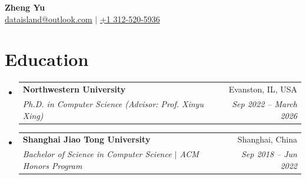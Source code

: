 \documentclass[letterpaper,11pt]{article}
\makeatletter
\newcommand{\resumeSubheadingDense}[4]{
  \vspace{-2pt}\item
    \begin{tabular*}{0.97\textwidth}[t]{l@{\extracolsep{\fill}}r}
      \textbf{#1} & #2 \\
      \textit{\small#3} & \textit{\small #4} \\
    \end{tabular*}\vspace{-12pt}
}
\newcommand{\resumeSubHeadingListStart}{\begin{itemize}[leftmargin=0.15in, label={}]}
\newcommand{\resumeSubHeadingListEnd}{\end{itemize}}
\makeatother
\begin{document}
\begin{center}
    \textbf{\Huge Zheng Yu} \\ \vspace{2pt}
    \href{mailto:dataisland@outlook.com}{\underline{dataisland@outlook.com}} 
    $|$  \underline{+1 312-520-5936}
\end{center}


\section{Education}
  \resumeSubHeadingListStart
    \resumeSubheadingDense
        {Northwestern University}{Evanston, IL, USA}
        {Ph.D. in Computer Science (Advisor: Prof. Xinyu Xing)}{Sep 2022 -- March 2026}
    \resumeSubheadingDense
        {Shanghai Jiao Tong University}{Shanghai, China}
        {Bachelor of Science in Computer Science $|$ ACM Honors Program}{Sep 2018 -- Jun 2022}
  \resumeSubHeadingListEnd
\end{document}
